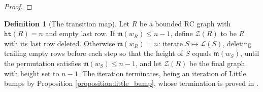 \documentclass{amsart}
\theoremstyle{definition}
\newtheorem{definition}[lemma]{Definition}
\theoremstyle{remark}
\numberwithin{equation}{subsection}
\newcommand{\wof}[1]{w_{#1}}
\newcommand{\rtt}{\mathtt{rt}}
\newcommand{\zeromap}{\mathcal{Z}}
\newcommand{\hr}{\mathtt{ht}}
\newcommand{\lmap}{\mathscr{L}}
\newcommand{\ltb}[2]{#1\!\uparrow_{#2}}
\newcommand{\maxd}{\mathfrak{m}}
\begin{document}
\begin{proof}
  
  
  
  

\end{proof}

\begin{definition}[The transition map]\label{definition:zeromap}
Let $R$ be a bounded RC graph with $\hr(R)=n$ and empty last row. If $\maxd(\wof R)\leq n-1$, define $\zeromap(R)$ to be $R$ with its last row deleted. Otherwise $\maxd(\wof R)=n$: iterate $S\mapsto\lmap(S)$, deleting trailing empty rows before each step so that the height of $S$ equals $\maxd(\wof S)$, until the permutation satisfies $\maxd(\wof S)\leq n-1$, and let $\zeromap(R)$ be the final graph with height set to $n-1$. The iteration terminates, being an iteration of Little bumps by Proposition \ref{proposition:little_bump}, whose termination is proved in \cite{little2003combinatorial}.
\end{definition}
\end{document}
